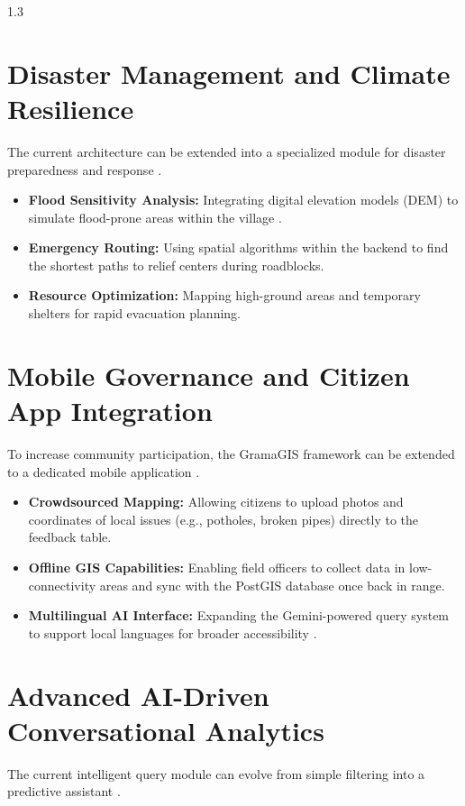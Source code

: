 \begin{spacing}{1.3}
\section{Disaster Management and Climate Resilience}

The current architecture can be extended into a specialized module for disaster preparedness and response \cite{fu2020webgis}.

\begin{itemize}
    \item \textbf{Flood Sensitivity Analysis:} Integrating digital elevation models (DEM) to simulate flood-prone areas within the village \cite{postgis_in_action}.
    \item \textbf{Emergency Routing:} Using spatial algorithms within the backend to find the shortest paths to relief centers during roadblocks.
    \item \textbf{Resource Optimization:} Mapping high-ground areas and temporary shelters for rapid evacuation planning.
\end{itemize}

\section{Mobile Governance and Citizen App Integration}

To increase community participation, the GramaGIS framework can be extended to a dedicated mobile application \cite{smart_panchayat2023}.

\begin{itemize}
    \item \textbf{Crowdsourced Mapping:} Allowing citizens to upload photos and coordinates of local issues (e.g., potholes, broken pipes) directly to the feedback table.
    \item \textbf{Offline GIS Capabilities:} Enabling field officers to collect data in low-connectivity areas and sync with the PostGIS database once back in range.
    \item \textbf{Multilingual AI Interface:} Expanding the Gemini-powered query system to support local languages for broader accessibility \cite{liu2025nalspatial}.
\end{itemize}

\section{Advanced AI-Driven Conversational Analytics}

The current intelligent query module can evolve from simple filtering into a predictive assistant \cite{liu2025nalspatial}.


\end{spacing}
